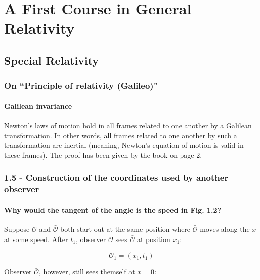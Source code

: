 



    \part{A First Course in General Relativity\cite{first-course-on-gr}}

    \chapter{Special Relativity}

    \section*{On ``Principle of relativity (Galileo)"}

    \subsection*{Galilean invariance}

    \href{https://en.wikipedia.org/wiki/Newton\%27s_laws_of_motion}{Newton's laws of motion} hold in all frames related
    to one another by a \href{https://en.wikipedia.org/wiki/Galilean\_transformation}{Galilean transformation}. In
    other words, all frames related to one another by such a transformation are inertial (meaning, Newton's equation of
    motion is valid in these frames).\cite{galilean-invariance} The proof has been given by the book on page 2.

    \section*{1.5 - Construction of the coordinates used by another observer}

    \subsection*{Why would the tangent of the angle is the speed in Fig. 1.2?}

    Suppose $\mathcal{O}$ and $\mathcal{\bar{O}}$ both start out at the same position where $\mathcal{\bar{O}}$
    moves along the $x$ at some speed. After $t_1$, observer $\mathcal{O}$ sees $\mathcal{\bar{O}}$ at position $x_1$:

    \[ \mathcal{\bar{O}}_1 = (x_1, t_1) \]

    Observer  $\mathcal{\bar{O}}$, however, still sees themself at $x = 0$:

